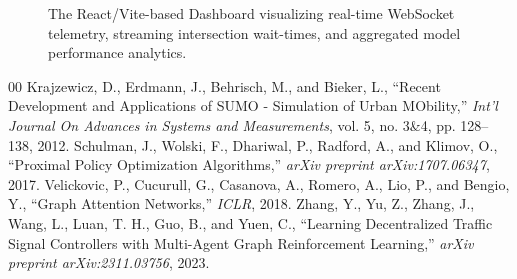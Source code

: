\documentclass[12pt, onecolumn]{IEEEtran}
\begin{document}
\begin{figure}[H]
    \centering
    \caption{The React/Vite-based Dashboard visualizing real-time WebSocket telemetry, streaming intersection wait-times, and aggregated model performance analytics.}
    \label{fig:app_dash}
\end{figure}

\begin{thebibliography}{00}
 Krajzewicz, D., Erdmann, J., Behrisch, M., and Bieker, L., ``Recent Development and Applications of SUMO - Simulation of Urban MObility,'' \textit{Int'l Journal On Advances in Systems and Measurements}, vol. 5, no. 3\&4, pp. 128--138, 2012.
 Schulman, J., Wolski, F., Dhariwal, P., Radford, A., and Klimov, O., ``Proximal Policy Optimization Algorithms,'' \textit{arXiv preprint arXiv:1707.06347}, 2017.
 Velickovic, P., Cucurull, G., Casanova, A., Romero, A., Lio, P., and Bengio, Y., ``Graph Attention Networks,'' \textit{ICLR}, 2018.
 Zhang, Y., Yu, Z., Zhang, J., Wang, L., Luan, T. H., Guo, B., and Yuen, C., ``Learning Decentralized Traffic Signal Controllers with Multi-Agent Graph Reinforcement Learning,'' \textit{arXiv preprint arXiv:2311.03756}, 2023.
\end{thebibliography}
\end{document}
